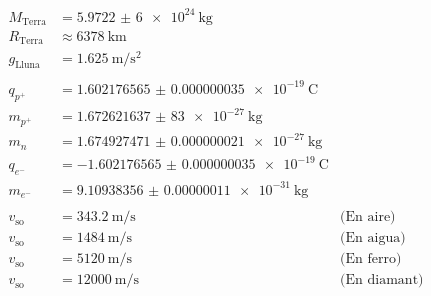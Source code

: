 \begin{align*}
    \\
    M_\text{Terra} &= \SI{5,9722(6)e24}{\kilo\gram}\\
    R_\text{Terra} &\approx \SI{6378}{\kilo\metre}\\
    g_\text{Lluna} &= \SI{1,625}{\metre\per\second\squared}\\
    \\
    q_{p^+} &= \SI{1.602176565(35)e-19}{\coulomb}\\
    m_{p^+} &= \SI{1,672621637(83)e-27}{\kilo\gram}\\
    m_{n} &= \SI{1.674927471(21)e-27}{\kilo\gram}\\
    q_{e^-} &= \SI{-1.602176565(35)e-19}{\coulomb}\\
    m_{e^-} &= \SI{9.10938356(11)e-31}{\kilo\gram}\\
    \\
    v_\text{so} &= \SI{343.2}{\metre\per\second} & \text{(En aire)}\\
    v_\text{so} &= \SI{1484}{\metre\per\second} & \text{(En aigua)}\\
    v_\text{so} &= \SI{5120}{\metre\per\second} & \text{(En ferro)}\\
    v_\text{so} &= \SI{12000}{\metre\per\second} & \text{(En diamant)}\\
\end{align*}





